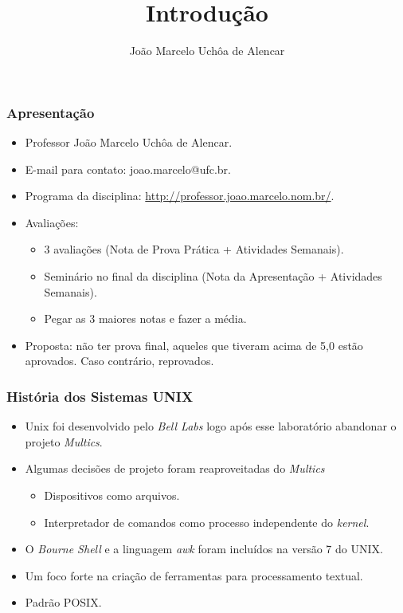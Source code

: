\documentclass{beamer}
\title{Introdução}
\author[João Marcelo Uchôa de Alencar]{João Marcelo Uchôa de Alencar}
\institute{Universidade Federal do Ceará - Quixadá}
\begin{document}
   \begin{frame}
      \titlepage
   \end{frame}


\begin{frame}
   \frametitle{Apresentação}
   \begin{itemize}
      \item Professor João Marcelo Uchôa de Alencar.
      \item E-mail para contato: joao.marcelo@ufc.br.
      \item Programa da disciplina: \url{http://professor.joao.marcelo.nom.br/}.
      \item Avaliações:
      \begin{itemize}
         \item 3 avaliações (Nota de Prova Prática + Atividades Semanais).
	 \item Seminário no final da disciplina (Nota da Apresentação + Atividades Semanais).
	 \item Pegar as 3 maiores notas e fazer a média.
      \end{itemize}
      \item Proposta: não ter prova final, aqueles que tiveram acima de 5,0 estão aprovados. Caso contrário, reprovados.
   \end{itemize}
\end{frame}


\begin{frame}
   \frametitle{História dos Sistemas UNIX}
   \begin{itemize}
      \item Unix foi desenvolvido pelo \textit{Bell Labs} logo após esse laboratório abandonar o projeto \textit{Multics}.
      \item Algumas decisões de projeto foram reaproveitadas do \textit{Multics}
      \begin{itemize}
         \item Dispositivos como arquivos.
	 \item Interpretador de comandos como processo independente do \textit{kernel}.
      \end{itemize}
      \item O \textit{Bourne Shell} e a linguagem \textit{awk} foram incluídos na versão 7 do UNIX.
      \item Um foco forte na criação de ferramentas para processamento textual.
      \item Padrão POSIX.
   \end{itemize}
\end{frame}
\end{document}
